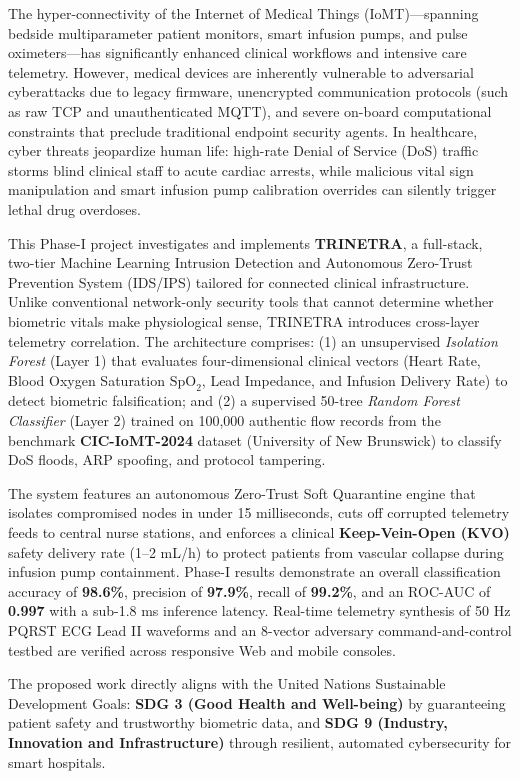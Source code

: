 \documentclass[12pt,a4paper]{report}
\begin{document}
\noindent
The hyper-connectivity of the Internet of Medical Things (IoMT)---spanning bedside multiparameter patient monitors, smart infusion pumps, and pulse oximeters---has significantly enhanced clinical workflows and intensive care telemetry. However, medical devices are inherently vulnerable to adversarial cyberattacks due to legacy firmware, unencrypted communication protocols (such as raw TCP and unauthenticated MQTT), and severe on-board computational constraints that preclude traditional endpoint security agents. In healthcare, cyber threats jeopardize human life: high-rate Denial of Service (DoS) traffic storms blind clinical staff to acute cardiac arrests, while malicious vital sign manipulation and smart infusion pump calibration overrides can silently trigger lethal drug overdoses.

This Phase-I project investigates and implements \textbf{TRINETRA}, a full-stack, two-tier Machine Learning Intrusion Detection and Autonomous Zero-Trust Prevention System (IDS/IPS) tailored for connected clinical infrastructure. Unlike conventional network-only security tools that cannot determine whether biometric vitals make physiological sense, TRINETRA introduces cross-layer telemetry correlation. The architecture comprises: (1) an unsupervised \textit{Isolation Forest} (Layer 1) that evaluates four-dimensional clinical vectors (Heart Rate, Blood Oxygen Saturation $\text{SpO}_2$, Lead Impedance, and Infusion Delivery Rate) to detect biometric falsification; and (2) a supervised 50-tree \textit{Random Forest Classifier} (Layer 2) trained on 100,000 authentic flow records from the benchmark \textbf{CIC-IoMT-2024} dataset (University of New Brunswick) to classify DoS floods, ARP spoofing, and protocol tampering.

The system features an autonomous Zero-Trust Soft Quarantine engine that isolates compromised nodes in under 15 milliseconds, cuts off corrupted telemetry feeds to central nurse stations, and enforces a clinical \textbf{Keep-Vein-Open (KVO)} safety delivery rate (1--2 mL/h) to protect patients from vascular collapse during infusion pump containment. Phase-I results demonstrate an overall classification accuracy of \textbf{98.6\%}, precision of \textbf{97.9\%}, recall of \textbf{99.2\%}, and an ROC-AUC of \textbf{0.997} with a sub-1.8 ms inference latency. Real-time telemetry synthesis of 50 Hz PQRST ECG Lead II waveforms and an 8-vector adversary command-and-control testbed are verified across responsive Web and mobile consoles.

The proposed work directly aligns with the United Nations Sustainable Development Goals: \textbf{SDG 3 (Good Health and Well-being)} by guaranteeing patient safety and trustworthy biometric data, and \textbf{SDG 9 (Industry, Innovation and Infrastructure)} through resilient, automated cybersecurity for smart hospitals.
\end{document}
